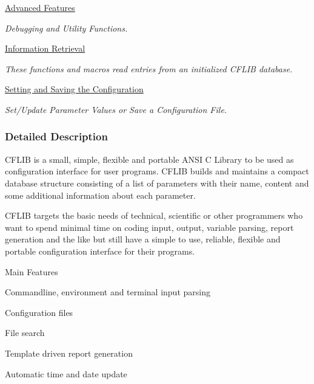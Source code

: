 \begin{DoxyCompactItemize}
\hyperlink{group__advanced__features}{Advanced Features}
\begin{DoxyCompactList}\small\item\em Debugging and Utility Functions. \end{DoxyCompactList}\item 
\hyperlink{group__retrieval}{Information Retrieval}
\begin{DoxyCompactList}\small\item\em These functions and macros read entries from an initialized C\-F\-L\-I\-B database. \end{DoxyCompactList}\item 
\hyperlink{group__setting__saving}{Setting and Saving the Configuration}
\begin{DoxyCompactList}\small\item\em Set/\-Update Parameter Values or Save a Configuration File. \end{DoxyCompactList}\end{DoxyCompactItemize}


\subsubsection{Detailed Description}
C\-F\-L\-I\-B is a small, simple, flexible and portable A\-N\-S\-I C Library to be used as configuration interface for user programs. C\-F\-L\-I\-B builds and maintains a compact database structure consisting of a list of parameters with their name, content and some additional information about each parameter.

C\-F\-L\-I\-B targets the basic needs of technical, scientific or other programmers who want to spend minimal time on coding input, output, variable parsing, report generation and the like but still have a simple to use, reliable, flexible and portable configuration interface for their programs.

\begin{DoxyParagraph}{Main Features}

\end{DoxyParagraph}

\begin{DoxyItemize}
\item Commandline, environment and terminal input parsing
\begin{DoxyItemize}
\item Configuration files
\item File search
\item Template driven report generation
\item Automatic time and date update
\end{DoxyItemize}
\end{DoxyItemize}

